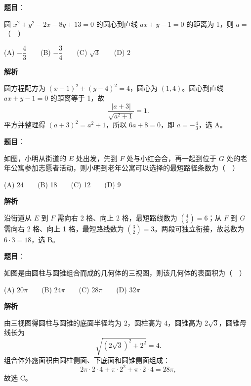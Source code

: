 \begin{answer}

\textbf{题目}：

圆 \(x^2+y^2-2x-8y+13=0\) 的圆心到直线 \(ax+y-1=0\) 的距离为 1，则 \(a=\)（　）

   (A) \(-\dfrac43\)　　(B) \(-\dfrac34\)　　(C) \(\sqrt3\)　　(D) \(2\)

\textbf{解析}

圆方程配方为 \((x-1)^2+(y-4)^2=4\)，圆心为 \((1,4)\)。圆心到直线 \(ax+y-1=0\) 的距离等于 1，故
\nopagebreak[4]
\[
\frac{|a+3|}{\sqrt{a^2+1}}=1.
\]
平方并整理得 \((a+3)^2=a^2+1\)，所以 \(6a+8=0\)，即 \(a=-\frac43\)，选 A。


\end{answer}
\begin{answer}

\textbf{题目}：

如图，小明从街道的 \(E\) 处出发，先到 \(F\) 处与小红会合，再一起到位于 \(G\) 处的老年公寓参加志愿者活动，则小明到老年公寓可以选择的最短路径条数为（　）
\nopagebreak[4]
\begin{center}\end{center}
\nopagebreak[4]
   (A) 24　　(B) 18　　(C) 12　　(D) 9

\textbf{解析}

沿街道从 \(E\) 到 \(F\) 需向右 2 格、向上 2 格，最短路线数为 \(\binom42=6\)；从 \(F\) 到 \(G\) 需向右 2 格、向上 1 格，最短路线数为 \(\binom32=3\)。两段可独立衔接，故总数为 \(6\cdot3=18\)，选 B。


\end{answer}
\begin{answer}

\textbf{题目}：

如图是由圆柱与圆锥组合而成的几何体的三视图，则该几何体的表面积为（　）
\nopagebreak[4]
\begin{center}\end{center}
\nopagebreak[4]
   (A) \(20\pi\)　　(B) \(24\pi\)　　(C) \(28\pi\)　　(D) \(32\pi\)

\textbf{解析}

由三视图得圆柱与圆锥的底面半径均为 2，圆柱高为 4，圆锥高为 \(2\sqrt3\)，圆锥母线长为
\nopagebreak[4]
\[
\sqrt{(2\sqrt3)^2+2^2}=4.
\]
组合体外露面积由圆柱侧面、下底面和圆锥侧面组成：
\nopagebreak[4]
\[
2\pi\cdot2\cdot4+\pi\cdot2^2+\pi\cdot2\cdot4=28\pi,
\]
故选 C。


\end{answer}
